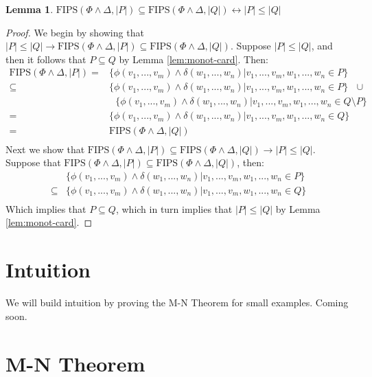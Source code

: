 \documentclass[12pt]{article}
\theoremstyle{definition}
\newtheorem{lemma}{Lemma}
\theoremstyle{remark}
\newcommand{\msp}{\text{ }}
\newcommand{\fips}{\text{FIPS}}
\begin{document}
\begin{lemma}
  \label{lem:fips-subset}
  $\fips(\Phi \land \Delta, |P|) \subseteq \fips(\Phi \land \Delta, |Q|) \leftrightarrow |P| \leq |Q|$
\end{lemma}
\begin{proof}
  We begin by showing that $|P| \leq |Q| \rightarrow \fips(\Phi \land \Delta, |P|) \subseteq \fips(\Phi \land \Delta, |Q|)$.  Suppose $|P| \leq |Q|$, and then it follows that $P \subseteq Q$ by Lemma \ref{lem:monot-card}.  Then:
  \begin{align*}
    \fips(\Phi \land \Delta, |P|) = &\{\phi(v_1,...,v_m) \land \delta(w_1,...,w_n) | v_1,...,v_m,w_1,...,w_n \in P\}\\
    \subseteq &\{\phi(v_1,...,v_m) \land \delta(w_1,...,w_n) | v_1,...,v_m,w_1,...,w_n \in P\} \msp \cup\\
              &\msp \{\phi(v_1,...,v_m) \land \delta(w_1,...,w_n) | v_1,...,v_m,w_1,...,w_n \in Q \setminus P\}\\
    = &\{\phi(v_1,...,v_m) \land \delta(w_1,...,w_n) | v_1,...,v_m,w_1,...,w_n \in Q\}\\
    = &\fips(\Phi \land \Delta, |Q|)\\
  \end{align*}
  Next we show that $\fips(\Phi \land \Delta, |P|) \subseteq \fips(\Phi \land \Delta, |Q|) \rightarrow |P| \leq |Q|$.  Suppose that $\fips(\Phi \land \Delta, |P|) \subseteq \fips(\Phi \land \Delta, |Q|)$, then:
  \begin{align*}
    &\{\phi(v_1,...,v_m) \land \delta(w_1,...,w_n) | v_1,...,v_m,w_1,...,w_n \in P\}\\
    \subseteq &\{\phi(v_1,...,v_m) \land \delta(w_1,...,w_n) | v_1,...,v_m,w_1,...,w_n \in Q\}\\
  \end{align*}
  Which implies that $P \subseteq Q$, which in turn implies that $|P| \leq |Q|$ by Lemma \ref{lem:monot-card}.
\end{proof}


\section{Intuition}
We will build intuition by proving the M-N Theorem for small examples.  Coming soon.


\section{M-N Theorem}
\end{document}
